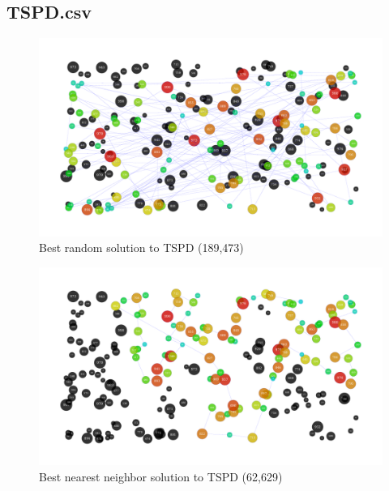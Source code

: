 \documentclass[14pt]{article}
\begin{document}
\subsection{TSPD.csv}
\begin{figure}[H]
	\begin{adjustwidth}{-3em}{0}
		\includegraphics{results/best_random_TSPD.pdf}
	\end{adjustwidth}
	\vspace{-15mm}
	\caption{Best random solution to TSPD (189,473)}
\end{figure}
\begin{figure}[H]
	\begin{adjustwidth}{-3em}{0}
		\includegraphics{results/best_nearest-neighbor_TSPD.pdf}
	\end{adjustwidth}
	\vspace{-15mm}
	\caption{Best nearest neighbor solution to TSPD (62,629)}
\end{figure}
\end{document}

